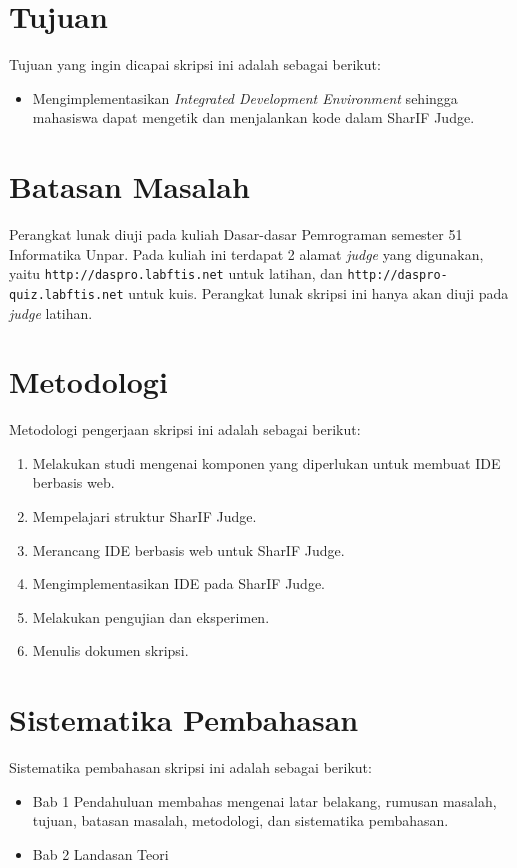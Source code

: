 \section{Tujuan}
\label{sec:tujuan}
Tujuan yang ingin dicapai skripsi ini adalah sebagai berikut:
\begin{itemize}
	\item Mengimplementasikan {\it Integrated Development Environment} sehingga mahasiswa dapat mengetik dan menjalankan kode dalam SharIF Judge.
\end{itemize}

\section{Batasan Masalah}
\label{sec:batasan}
Perangkat lunak diuji pada kuliah Dasar-dasar Pemrograman semester 51 Informatika Unpar. Pada kuliah ini terdapat 2 alamat \textit{judge} yang digunakan, yaitu \verb|http://daspro.labftis.net| untuk latihan, dan \verb|http://daspro-quiz.labftis.net| untuk kuis. Perangkat lunak skripsi ini hanya akan diuji pada \textit{judge} latihan.

\section{Metodologi}
\label{sec:metlit}
Metodologi pengerjaan skripsi ini adalah sebagai berikut:
\begin{enumerate}
	\item Melakukan studi mengenai komponen yang diperlukan untuk membuat IDE berbasis web.
	\item Mempelajari struktur SharIF Judge.
	\item Merancang IDE berbasis web untuk SharIF Judge.
	\item Mengimplementasikan IDE pada SharIF Judge.
	\item Melakukan pengujian dan eksperimen.
	\item Menulis dokumen skripsi.
\end{enumerate}

\section{Sistematika Pembahasan}
\label{sec:sispem}
Sistematika pembahasan skripsi ini adalah sebagai berikut:
\begin{itemize}
	\item Bab 1 Pendahuluan membahas mengenai latar belakang, rumusan masalah, tujuan, batasan masalah, metodologi, dan sistematika pembahasan.
	\item Bab 2 Landasan Teori
\end{itemize}
